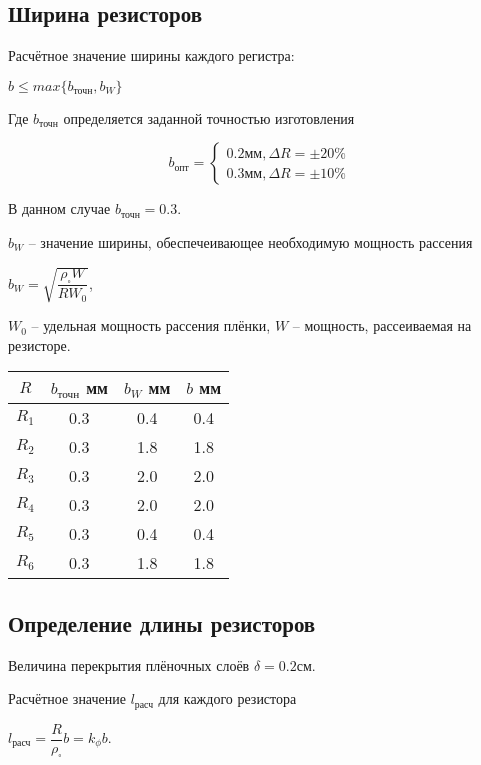 \documentclass[12pt, a4paper] {ncc}
\begin{document}
	\subsection{Ширина резисторов}

    	Расчётное значение ширины каждого регистра:
        \begin{center}
        	$b \le max \{ b_{\text{точн}}, b_W\}$
        \end{center}
		Где $b_{\text{точн}}$ определяется заданной точностью изготовления

		\[ b_{\text{опт}} =
			\begin{cases}
				0.2 мм, \Delta R = \pm 20 \% \\
				0.3 мм, \Delta R = \pm 10 \%
			\end{cases}
		\]

		В данном случае $b_{\text{точн}} = 0.3$.

		$b_W$ -- значение ширины, обеспечеивающее необходимую мощность рассения
		\begin{center}
			$b_W = \sqrt {\dfrac {\rho_{\square} W} {R W_0}}$,
		\end{center}
		$W_0$ -- удельная мощность рассения плёнки, $W$ -- мощность, рассеиваемая
		на резисторе.

		\begin{tabular}{|c|c|c|c|}
			\hline
			$R$   & $b_\text{точн}$ мм & $b_W$ мм & $b$ мм \\ \hline
			$R_1$ &  0.3               & 0.4      &  0.4   \\ \hline
			$R_2$ &  0.3               & 1.8      &  1.8   \\ \hline
			$R_3$ &  0.3               & 2.0      &  2.0   \\ \hline
			$R_4$ &  0.3               & 2.0      &  2.0   \\ \hline
			$R_5$ &  0.3               & 0.4      &  0.4   \\ \hline
			$R_6$ &  0.3               & 1.8      &  1.8   \\ \hline
		\end{tabular}

	\subsection{Определение длины резисторов}
		Величина перекрытия плёночных слоёв $\delta = 0.2 \text{см}$.

		Расчётное значение $l_{\text{расч}}$ для каждого резистора
		\begin{center}
			$l_{\text{расч}} = \dfrac {R} {\rho_{\square}} b = k_{\phi} b $.
		\end{center}
\end{document}
